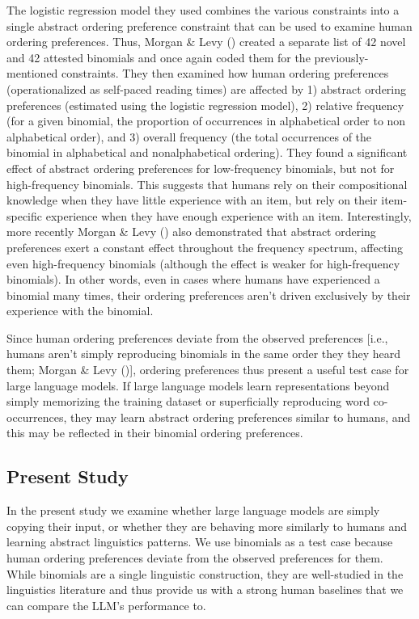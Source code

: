 \documentclass[
  12pt,
  letterpaper,
]{scrreport}
\begin{document}
The logistic regression model they used combines the various constraints
into a single abstract ordering preference constraint that can be used
to examine human ordering preferences. Thus, Morgan \& Levy
() created a
separate list of 42 novel and 42 attested binomials and once again coded
them for the previously-mentioned constraints. They then examined how
human ordering preferences (operationalized as self-paced reading times)
are affected by 1) abstract ordering preferences (estimated using the
logistic regression model), 2) relative frequency (for a given binomial,
the proportion of occurrences in alphabetical order to non alphabetical
order), and 3) overall frequency (the total occurrences of the binomial
in alphabetical and nonalphabetical ordering). They found a significant
effect of abstract ordering preferences for low-frequency binomials, but
not for high-frequency binomials. This suggests that humans rely on
their compositional knowledge when they have little experience with an
item, but rely on their item-specific experience when they have enough
experience with an item. Interestingly, more recently Morgan \& Levy
() also demonstrated that abstract
ordering preferences exert a constant effect throughout the frequency
spectrum, affecting even high-frequency binomials (although the effect
is weaker for high-frequency binomials). In other words, even in cases
where humans have experienced a binomial many times, their ordering
preferences aren't driven exclusively by their experience with the
binomial.

Since human ordering preferences deviate from the observed preferences
{[}i.e., humans aren't simply reproducing binomials in the same order
they they heard them; Morgan \& Levy
(){]}, ordering preferences thus present
a useful test case for large language models. If large language models
learn representations beyond simply memorizing the training dataset or
superficially reproducing word co-occurrences, they may learn abstract
ordering preferences similar to humans, and this may be reflected in
their binomial ordering preferences.

\subsection{Present Study}\label{present-study-1}

In the present study we examine whether large language models are simply
copying their input, or whether they are behaving more similarly to
humans and learning abstract linguistics patterns. We use binomials as a
test case because human ordering preferences deviate from the observed
preferences for them. While binomials are a single linguistic
construction, they are well-studied in the linguistics literature and
thus provide us with a strong human baselines that we can compare the
LLM's performance to.
\end{document}
